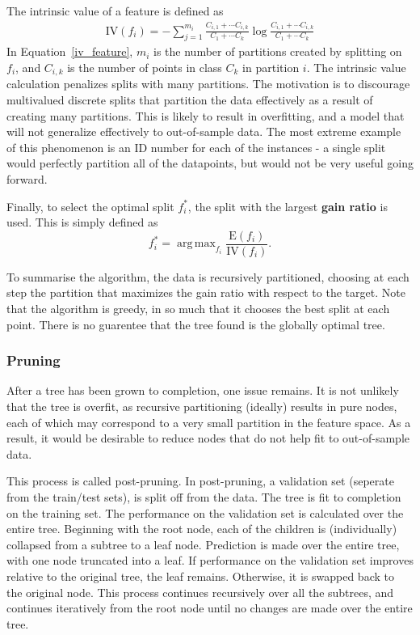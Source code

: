 \documentclass{amsart}
\DeclareMathOperator*{\argmax}{arg\,max}
\begin{document}
    The intrinsic value of a feature is defined as
    \begin{align}
        \textrm{IV}(f_i) = -\sum_{j=1}^{m_i} \frac{C_{i, 1} + \cdots C_{i, k}}
        {C_{1} + \cdots C_{k}} \log  \frac{C_{i, 1} + \cdots C_{i, k}}
        {C_{1} + \cdots C_{k}}
    \label{iv_feature}
    \end{align}
    In Equation~\ref{iv_feature}, $m_i$ is the number of partitions created by splitting
    on $f_i$, and $C_{i, k}$ is the number of points in class $C_k$ in partition $i$.
    The intrinsic value calculation penalizes splits with many partitions. The
    motivation is to discourage multivalued discrete splits that
    partition the data effectively as a result of creating many partitions. This is
    likely to result in overfitting, and a model that will not generalize effectively
    to out-of-sample data. The most extreme example of this phenomenon is an ID number
    for each of the instances - a single split would perfectly partition all of the
    datapoints, but would not be very useful going forward.

    Finally, to select the optimal split $f_i^*$, the split with the largest \textbf{gain ratio}
    is used. This is simply defined as
    \[
        f_i^* = \argmax_{f_i} \frac{\textrm{E}(f_i)}{\textrm{IV}(f_i)}.
    \]

    To summarise the algorithm, the data is recursively partitioned, choosing at each step
    the partition that maximizes the gain ratio with respect to the target. Note that
    the algorithm is greedy, in so much that it chooses the best split at each point.
    There is no guarentee that the tree found is the globally optimal tree.

    \subsubsection{Pruning}
    After a tree has been grown to completion, one issue remains. It is not unlikely that the tree is overfit,
    as recursive partitioning (ideally) results in pure nodes, each of which may correspond to a
    very small partition in the feature space. As a result, it would be desirable to reduce nodes that
    do not help fit to out-of-sample data.

    This process is called post-pruning\cite{textbook}.
    In post-pruning, a validation set (seperate from the train/test sets),
    is split off from the data. The tree is fit to completion on the training set.
    The performance on the validation set is calculated over the entire tree.
    Beginning with the root node,
    each of the children is (individually) collapsed from a subtree to a leaf node. Prediction
    is made over the entire tree, with one node truncated into a leaf. If performance
    on the validation set improves relative to the original tree, the leaf remains. Otherwise,
    it is swapped back to the original node. This process continues recursively over all the subtrees,
    and continues iteratively from the root node until no changes are made over the entire tree.
\end{document}
